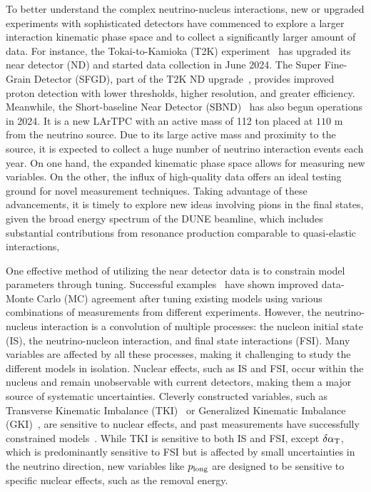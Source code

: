 To better understand the complex neutrino-nucleus interactions, new or upgraded experiments with sophisticated detectors have commenced to explore a larger interaction kinematic phase space and to collect a significantly larger amount of data. 
For instance, the Tokai-to-Kamioka (T2K) experiment~\cite{T2K:2011qtm} has upgraded its near detector (ND) and started data collection in June 2024. 
The Super Fine-Grain Detector (SFGD), part of the T2K ND upgrade~\cite{T2K:2019bbb}, provides improved proton detection with lower thresholds, higher resolution, and greater efficiency. 
Meanwhile, the Short-baseline Near Detector (SBND)~\cite{MicroBooNE:2015bmn} has also begun operations in 2024. 
It is a new LArTPC with an active mass of 112 ton placed at $110$ m from the neutrino source. 
Due to its large active mass and proximity to the source,  it is expected to collect a huge number of neutrino interaction events each year.  
On one hand, the expanded kinematic phase space allows for measuring new variables. 
On the other, the influx of high-quality data offers an ideal testing ground for novel measurement techniques.
Taking advantage of these advancements, it is timely to explore new ideas involving pions in the final states, given the broad energy spectrum of the DUNE beamline, which includes substantial contributions from resonance production comparable to quasi-elastic interactions, 

One effective method of utilizing the near detector data is to constrain model parameters through tuning.
Successful examples~\cite{GENIE:2021zuu,GENIE:2021wox,GENIE:2022qrc} have shown improved data-Monte Carlo (MC) agreement after tuning existing models using various combinations of measurements from different experiments. 
However, the neutrino-nucleus interaction is a convolution of multiple processes: the nucleon initial state (IS), the neutrino-nucleon interaction, and final state interactions (FSI). 
Many variables are affected by all these processes, making it challenging to study the different models in isolation. 
Nuclear effects, such as IS and FSI, occur within the nucleus and remain unobservable with current detectors, making them a major source of systematic uncertainties.
Cleverly constructed variables, such as Transverse Kinematic Imbalance (TKI)~\cite{Lu:2015hea, Lu:2015tcr} or Generalized Kinematic Imbalance (GKI)~\cite{MicroBooNE:2023krv}, are sensitive to nuclear effects, and past measurements have successfully constrained models~\cite{GENIE:2024ufm}. 
While TKI is sensitive to both IS and FSI, except $\delta\alpha_\textrm{T}$, which is predominantly sensitive to FSI but is affected by small uncertainties in the neutrino direction, new variables like $p_{\textrm{long}}$ \cite{Baudis:2023tma} are designed to be sensitive to specific nuclear effects, such as the removal energy. 

